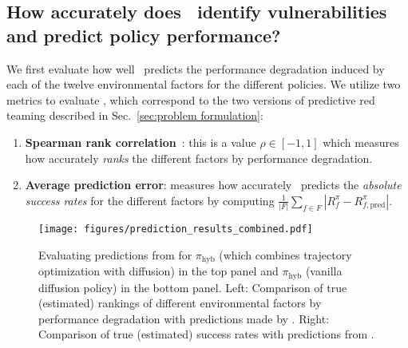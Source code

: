\subsection{How accurately does \redit~identify vulnerabilities and predict policy performance?}
\label{sec:redit experiments}

We first evaluate how well \redit~predicts the performance degradation induced by each of the twelve environmental factors for the different policies. We utilize two metrics to evaluate \redit, which correspond to the two versions of predictive red teaming described in Sec.~\ref{sec:problem formulation}: 
\begin{enumerate}
    \item {\bf Spearman rank correlation}~\cite{zar2005spearman}: this is a value $\rho \in [-1,1]$ which measures how accurately \redit \emph{ranks} the different factors by performance degradation. 
    \item {\bf Average prediction error}: measures how accurately \redit~predicts the \emph{absolute success rates} for the different factors by computing $\frac{1}{|F|}\sum_{f \in F} |R_{f}^\pi - R_{f, \text{pred}}^\pi|$. 
    \end{enumerate}
    
\begin{figure*}[t]
    \centering
    \texttt{[image: figures/prediction\_results\_combined.pdf]}
    \caption{Evaluating predictions from \redit for  $\pi_\text{hyb}$ (which combines trajectory optimization with diffusion) in the top panel and $\pi_\text{hyb}$ (vanilla diffusion policy) in the bottom panel. Left: Comparison of true (estimated) rankings of different environmental factors by performance degradation with predictions made by \redit. Right: Comparison of true (estimated) success rates with predictions from \redit.}
    \label{fig:predictions hybrid}
    \vspace{-10pt}
\end{figure*}


